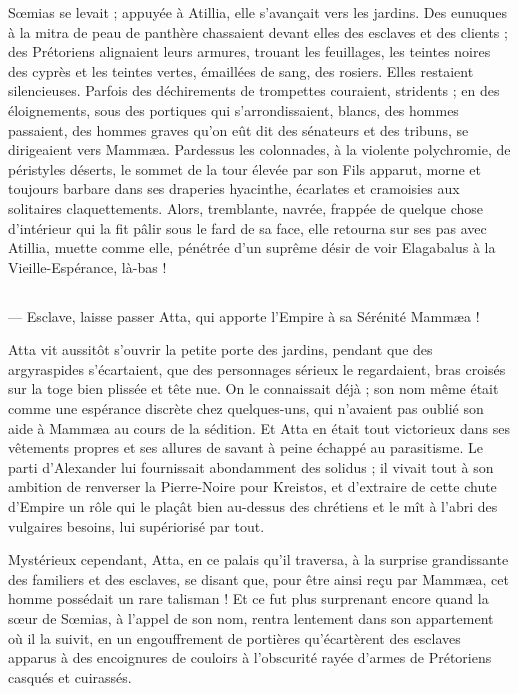 \documentclass[a4paper, 11pt, oneside, polutonikogreek, french]{article}
\begin{document}
Sœmias se levait ; appuyée à Atillia, elle s'avançait vers les jardins. Des eunuques à la mitra de peau de panthère chassaient devant elles des esclaves et des clients ; des Prétoriens alignaient leurs armures, trouant les feuillages, les teintes noires des cyprès et les teintes vertes, émaillées de sang, des rosiers. Elles restaient silencieuses. Parfois des déchirements de trompettes couraient, stridents ; en des éloignements, sous des portiques qui s'arrondissaient, blancs, des hommes passaient, des hommes graves qu'on eût dit des sénateurs et des tribuns, se dirigeaient vers Mammæa. Pardessus les colonnades, à la violente polychromie, de péristyles déserts, le sommet de la tour élevée par son Fils apparut, morne et toujours barbare dans ses draperies hyacinthe, écarlates et cramoisies aux solitaires claquettements. Alors, tremblante, navrée, frappée de quelque chose d'intérieur qui la fit pâlir sous le fard de sa face, elle retourna sur ses pas avec Atillia, muette comme elle, pénétrée d'un suprême désir de voir Elagabalus à la Vieille-Espérance, là-bas !
\clearpage
\subsection{}
\paragraph{}
--- Esclave, laisse passer Atta, qui apporte l'Empire à sa Sérénité Mammæa !

Atta vit aussitôt s'ouvrir la petite porte des jardins, pendant que des argyraspides s'écartaient, que des personnages sérieux le regardaient, bras croisés sur la toge bien plissée et tête nue. On le connaissait déjà ; son nom même était comme une espérance discrète chez quelques-uns, qui n'avaient pas oublié son aide à Mammæa au cours de la sédition. Et Atta en était tout victorieux dans ses vêtements propres et ses allures de savant à peine échappé au parasitisme. Le parti d'Alexander lui fournissait abondamment des solidus ; il vivait tout à son ambition de renverser la Pierre-Noire pour Kreistos, et d'extraire de cette chute d'Empire un rôle qui le plaçât bien au-dessus des chrétiens et le mît à l'abri des vulgaires besoins, lui supériorisé par tout.

Mystérieux cependant, Atta, en ce palais qu'il traversa, à la surprise grandissante des familiers et des esclaves, se disant que, pour être ainsi reçu par Mammæa, cet homme possédait un rare talisman ! Et ce fut plus surprenant encore quand la sœur de Sœmias, à l'appel de son nom, rentra lentement dans son appartement où il la suivit, en un engouffrement de portières qu'écartèrent des esclaves apparus à des encoignures de couloirs à l'obscurité rayée d'armes de Prétoriens casqués et cuirassés.
\end{document}
